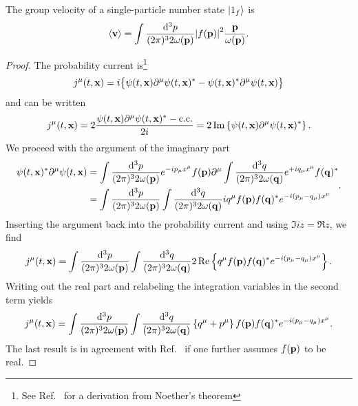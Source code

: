 \begin{lemma}\label{thm:number_state_single_group_velocity}
	The group velocity of a single-particle number state $\ket{1_f}$ is
	\begin{equation}
		\expval{\vb{v}}
		=
		\int\frac{\dd[3]{p}}{(2\pi)^32\omega(\vb{p})}
		\abs{f(\vb{p})}^2
		\frac{\vb{p}}{\omega(\vb{p})}
		\label{eq:single_particle_number_state_group_velocity}
		.
	\end{equation}
\end{lemma}
\begin{proof}
	The probability current is\footnote{See Ref.~\cite[p.~18]{Peskin1995} for a derivation from Noether's theorem}
	\begin{equation*}
		j^\mu(t,\vb{x})
		=
		i
		\bigl\{
			\psi(t,\vb{x})
			\partial^\mu
			\psi(t,\vb{x})^*
			-
			\psi(t,\vb{x})^*
			\partial^\mu
			\psi(t,\vb{x})
		\bigr\}
	\end{equation*}
	and can be written
	\begin{equation*}
		j^\mu(t,\vb{x})
		=
		2\frac{\psi(t,\vb{x})\partial^\mu\psi(t,\vb{x})^*-\text{c.c.}}{2i}
		=
		2\operatorname{\operatorname{Im}}\left\{
			\psi(t,\vb{x})
			\partial^\mu
			\psi(t,\vb{x})^*
		\right\}
		.
	\end{equation*}
	We proceed with the argument of the imaginary part
	\begin{equation*}
		\begin{split}
			\psi(t,\vb{x})^*
			\partial^\mu
			\psi(t,\vb{x})
			&=
			\int\frac{\dd[3]{p}}{(2\pi)^32\omega(\vb{p})}
			e^{-ip_\mu x^\mu}
			f(\vb{p})
			\partial^\mu
			\int\frac{\dd[3]{q}}{(2\pi)^32\omega(\vb{q})}
			e^{+iq_\mu x^\mu}
			f(\vb{q})^*
			\\
			&=
			\int\frac{\dd[3]{p}}{(2\pi)^32\omega(\vb{p})}
			\int\frac{\dd[3]{q}}{(2\pi)^32\omega(\vb{q})}
			iq^\mu
			f(\vb{p})
			f(\vb{q})^*
			e^{-i(p_\mu-q_\mu)x^\mu}
		\end{split}
		.
	\end{equation*}
	Inserting the argument back into the probability current and using $\Im{iz}=\Re{z}$, we find
	\begin{equation*}
		j^\mu(t,\vb{x})
		=
		\int\frac{\dd[3]{p}}{(2\pi)^32\omega(\vb{p})}
		\int\frac{\dd[3]{q}}{(2\pi)^32\omega(\vb{q})}
		2\operatorname{\operatorname{Re}}\left\{
			q^\mu
			f(\vb{p})
			f(\vb{q})^*
			e^{-i(p_\mu-q_\mu)x^\mu}
		\right\}
		.
	\end{equation*}
	Writing out the real part and relabeling the integration variables in the second term yields
	\begin{equation*}
		j^\mu(t,\vb{x})
		=
		\int\frac{\dd[3]{p}}{(2\pi)^32\omega(\vb{p})}
		\int\frac{\dd[3]{q}}{(2\pi)^32\omega(\vb{q})}
		\left\{
			q^\mu
			+
			p^\mu
		\right\}
		f(\vb{p})
		f(\vb{q})^*
		e^{-i(p_\mu-q_\mu)x^\mu}
		.
	\end{equation*}	
	The last result is in agreement with Ref.~\cite[eqs.~36,37]{Naumov2013} if one further assumes $f(\vb{p})$ to be real.
\end{proof}

